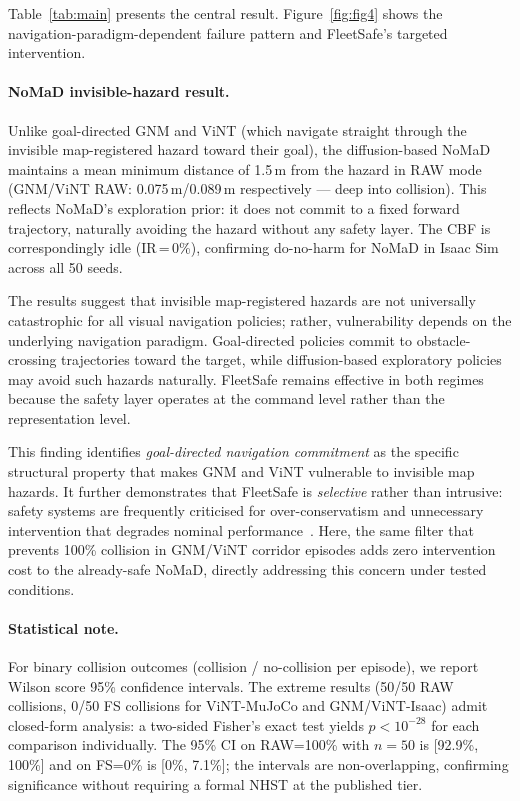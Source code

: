 \documentclass[letterpaper]{article}
\begin{document}
Table~\ref{tab:main} presents the central result.
Figure~\ref{fig:fig4} shows the navigation-paradigm-dependent failure pattern
and FleetSafe's targeted intervention.

\paragraph{NoMaD invisible-hazard result.}
Unlike goal-directed GNM and ViNT (which navigate straight through the
invisible map-registered hazard toward their goal), the diffusion-based NoMaD
maintains a mean minimum distance of 1.5\,m from the hazard in RAW mode
(GNM/ViNT RAW: 0.075\,m/0.089\,m respectively --- deep into collision).
This reflects NoMaD's exploration prior: it does not commit to a fixed
forward trajectory, naturally avoiding the hazard without any safety layer.
The CBF is correspondingly idle (IR\,=\,0\%), confirming do-no-harm for NoMaD
in Isaac Sim across all 50 seeds.

The results suggest that invisible map-registered hazards are not universally
catastrophic for all visual navigation policies; rather, vulnerability depends
on the underlying navigation paradigm. Goal-directed policies commit to
obstacle-crossing trajectories toward the target, while diffusion-based
exploratory policies may avoid such hazards naturally. FleetSafe remains
effective in both regimes because the safety layer operates at the
command level rather than the representation level.

This finding identifies \emph{goal-directed navigation commitment} as the
specific structural property that makes GNM and ViNT vulnerable to invisible
map hazards. It further demonstrates that FleetSafe is \emph{selective}
rather than intrusive: safety systems are frequently criticised for
over-conservatism and unnecessary intervention that degrades nominal
performance~\cite{brunke2022safe}. Here, the same filter that prevents
100\% collision in GNM/ViNT corridor episodes adds zero intervention cost
to the already-safe NoMaD, directly addressing this concern under tested
conditions.

\paragraph{Statistical note.}
For binary collision outcomes (collision / no-collision per episode), we report
Wilson score 95\% confidence intervals. The extreme results (50/50 RAW collisions,
0/50 FS collisions for ViNT-MuJoCo and GNM/ViNT-Isaac) admit closed-form
analysis: a two-sided Fisher's exact test yields $p < 10^{-28}$ for each
comparison individually. The 95\% CI on RAW=100\% with $n=50$ is [92.9\%, 100\%]
and on FS=0\% is [0\%, 7.1\%]; the intervals are non-overlapping, confirming
significance without requiring a formal NHST at the published tier.
\end{document}
